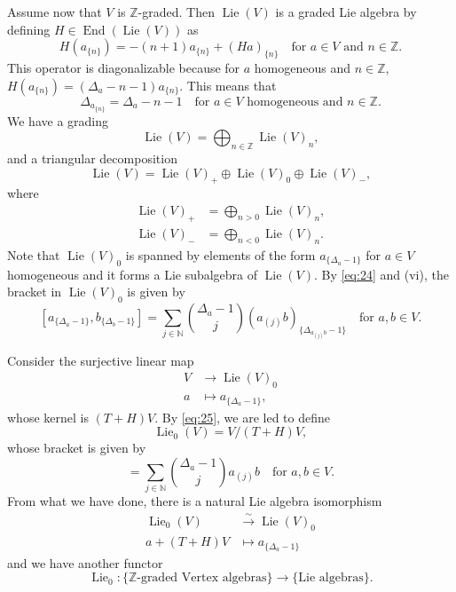\documentclass[a4paper, 12pt, reqno]{amsart}
\theoremstyle{remark}
\numberwithin{equation}{subsection}
\DeclareMathOperator{\End}{End}
\DeclareMathOperator{\Lie}{Lie}
\begin{document}
Assume now that $V$ is $\mathbb{Z}$-graded.
Then $\Lie(V)$ is a graded Lie algebra by defining $H \in \End(\Lie(V))$ as
\begin{equation*}
  H(a_{\{n\}}) = -(n + 1)a_{\{n\}} + (Ha)_{\{n\}} \quad \text{for }a \in V\text{ and }n \in \mathbb{Z}.
\end{equation*}
This operator is diagonalizable because for $a$ homogeneous and $n \in \mathbb{Z}$, $H(a_{\{n\}}) = (\Delta_a - n - 1)a_{\{n\}}$.
This means that
\begin{equation*}
  \Delta_{a_{\{n\}}} = \Delta_a - n - 1\quad \text{for }a \in V\text{ homogeneous and }n \in \mathbb{Z}.
\end{equation*}
We have a grading
\begin{equation*}
  \Lie(V) = \bigoplus_{n \in \mathbb{Z}}\Lie(V)_n,
\end{equation*}
and a triangular decomposition
\begin{equation*}
  \Lie(V) = \Lie(V)_+ \oplus \Lie(V)_0 \oplus \Lie(V)_-,
\end{equation*}
where
\begin{align*}
  \Lie(V)_+ &= \bigoplus_{n > 0}\Lie(V)_n, \\
  \Lie(V)_- &= \bigoplus_{n < 0}\Lie(V)_n.
\end{align*}
Note that $\Lie(V)_0$ is spanned by elements of the form $a_{\{\Delta_a - 1\}}$ for $a \in V$ homogeneous and it forms a Lie subalgebra of $\Lie(V)$.
By \eqref{eq:24} and (vi), the bracket in $\Lie(V)_0$ is given by
\begin{equation}
  \label{eq:25}
  [a_{\{\Delta_a - 1\}}, b_{\{\Delta_b - 1\}}] = \sum_{j \in \mathbb{N}}\binom{\Delta_a - 1}{j}(a_{(j)}b)_{\{\Delta_{a_{(j)}b} - 1\}}\quad \text{for }a, b \in V.
\end{equation}

Consider the surjective linear map
\begin{align*}
  V &\to \Lie(V)_0 \\
  a &\mapsto a_{\{\Delta_a - 1\}},
\end{align*}
whose kernel is $(T + H)V$.
By \eqref{eq:25}, we are led to define
\begin{equation*}
  \Lie_0(V) = V/(T + H)V,
\end{equation*}
whose bracket is given by
\begin{equation*}
  [a + (T + H)V, b + (T + H)V] = \sum_{j \in \mathbb{N}}\binom{\Delta_a - 1}{j}a_{(j)}b \quad \text{for }a, b \in V.
\end{equation*}
From what we have done, there is a natural Lie algebra isomorphism
\begin{align*}
  \Lie_0(V) &\xrightarrow{\sim} \Lie(V)_0 \\
  a + (T + H)V &\mapsto a_{\{\Delta_a - 1\}}
\end{align*}
and we have another functor
\begin{equation*}
  \Lie_0: \{\text{$\mathbb{Z}$-graded Vertex algebras}\} \to \{\text{Lie algebras}\}.
\end{equation*}
\end{document}
